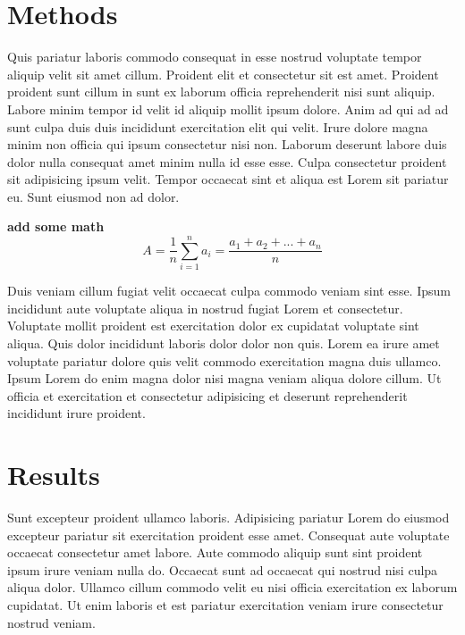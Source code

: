 \setlength{\parskip}{0.05cm plus4mm minus3mm}

\hypertarget{methods}{%
\section{Methods}\label{methods}}

Quis pariatur laboris commodo consequat in esse nostrud voluptate tempor
aliquip velit sit amet cillum. Proident elit et consectetur sit est
amet. Proident proident sunt cillum in sunt ex laborum officia
reprehenderit nisi sunt aliquip. Labore minim tempor id velit id aliquip
mollit ipsum dolore. Anim ad qui ad ad sunt culpa duis duis incididunt
exercitation elit qui velit. Irure dolore magna minim non officia qui
ipsum consectetur nisi non. Laborum deserunt labore duis dolor nulla
consequat amet minim nulla id esse esse. Culpa consectetur proident sit
adipisicing ipsum velit. Tempor occaecat sint et aliqua est Lorem sit
pariatur eu. Sunt eiusmod non ad dolor.

\textbf{add some math}
\[ A = \frac{1}{n} {\sum_{i=1}^n a_i} = \frac{a_1 + a_2 + ... + a_n}{n} \]

Duis veniam cillum fugiat velit occaecat culpa commodo veniam sint esse.
Ipsum incididunt aute voluptate aliqua in nostrud fugiat Lorem et
consectetur. Voluptate mollit proident est exercitation dolor ex
cupidatat voluptate sint aliqua. Quis dolor incididunt laboris dolor
dolor non quis. Lorem ea irure amet voluptate pariatur dolore quis velit
commodo exercitation magna duis ullamco. Ipsum Lorem do enim magna dolor
nisi magna veniam aliqua dolore cillum. Ut officia et exercitation et
consectetur adipisicing et deserunt reprehenderit incididunt irure
proident.

\setlength{\parskip}{0.05cm plus4mm minus3mm}

\hypertarget{results}{%
\section{Results}\label{results}}

Sunt excepteur proident ullamco laboris. Adipisicing pariatur Lorem do
eiusmod excepteur pariatur sit exercitation proident esse amet.
Consequat aute voluptate occaecat consectetur amet labore. Aute commodo
aliquip sunt sint proident ipsum irure veniam nulla do. Occaecat sunt ad
occaecat qui nostrud nisi culpa aliqua dolor. Ullamco cillum commodo
velit eu nisi officia exercitation ex laborum cupidatat. Ut enim laboris
et est pariatur exercitation veniam irure consectetur nostrud veniam.

